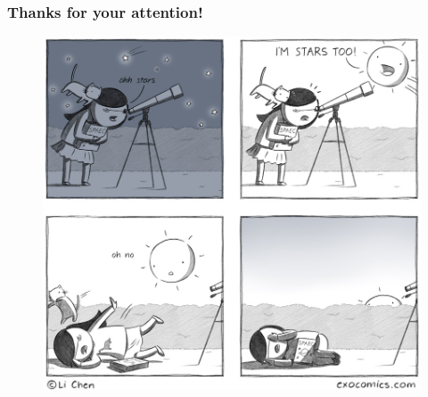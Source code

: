 \documentclass[10pt, compress]{beamer}
\begin{document}
\begin{frame}[fragile] \frametitle{Thanks for your attention!}
    \begin{figure}[!hb] 
        \centering
        \includegraphics[height=.85\textheight,frame]{figs/comic.jpg}
    \end{figure}
\end{frame}
\end{document}
